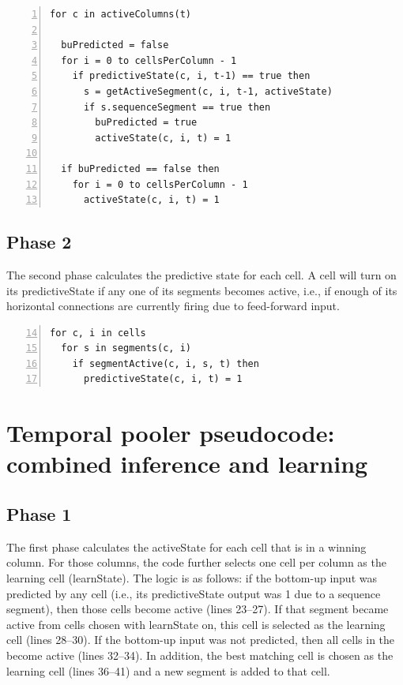 \documentclass{report}
\begin{document}
\begin{lstlisting}[numbers=left]
for c in activeColumns(t)

  buPredicted = false
  for i = 0 to cellsPerColumn - 1
    if predictiveState(c, i, t-1) == true then
      s = getActiveSegment(c, i, t-1, activeState)
      if s.sequenceSegment == true then
        buPredicted = true
        activeState(c, i, t) = 1

  if buPredicted == false then
    for i = 0 to cellsPerColumn - 1
      activeState(c, i, t) = 1
\end{lstlisting}

\subsection*{Phase 2}
The second phase calculates the predictive state for each cell. A cell
will turn on its predictiveState if any one of its segments becomes
active, i.e., if enough of its horizontal connections are currently
firing due to feed-forward input.

\begin{lstlisting}[numbers=left,firstnumber=14]
for c, i in cells
  for s in segments(c, i)
    if segmentActive(c, i, s, t) then
      predictiveState(c, i, t) = 1
\end{lstlisting}

\section*{Temporal pooler pseudocode: combined inference and learning}

\subsection*{Phase 1}

The first phase calculates the activeState for each cell that is in a
winning column. For those columns, the code further selects one cell
per column as the learning cell (learnState). The logic is as follows:
if the bottom-up input was predicted by any cell (i.e., its
predictiveState output was 1 due to a sequence segment), then those
cells become active (lines 23--27). If that segment became active from
cells chosen with learnState on, this cell is selected as the learning
cell (lines 28--30). If the bottom-up input was not predicted, then
all cells in the become active (lines 32--34). In addition, the best
matching cell is chosen as the learning cell (lines 36--41) and a new
segment is added to that cell.
\end{document}
